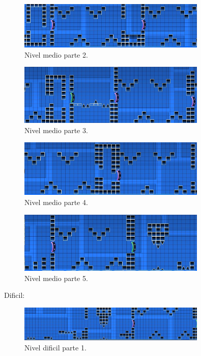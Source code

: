 \documentclass{article}
\begin{document}
\begin{figure}[H]
    \centering
    \includegraphics[width=0.8\textwidth]{Niveles/Medio/M2.jpg}
    \caption{Nivel medio parte 2.}
    \label{medio_2}
\end{figure}
\begin{figure}[H]
    \centering
    \includegraphics[width=0.8\textwidth]{Niveles/Medio/M3.jpg}
    \caption{Nivel medio parte 3.}
    \label{medio_3}
\end{figure}
\begin{figure}[H]
    \centering
    \includegraphics[width=0.8\textwidth]{Niveles/Medio/M4.jpg}
    \caption{Nivel medio parte 4.}
    \label{medio_4}
\end{figure}
\begin{figure}[H]
    \centering
    \includegraphics[width=0.8\textwidth]{Niveles/Medio/M5.jpg}
    \caption{Nivel medio parte 5.}
    \label{medio_5}
\end{figure}
Dificil:
\begin{figure}[H]
    \centering
    \includegraphics[width=0.8\textwidth]{Niveles/Dificil/d1.jpg}
    \caption{Nivel dificil parte 1.}
    \label{dificil_1}
\end{figure}
\end{document}

